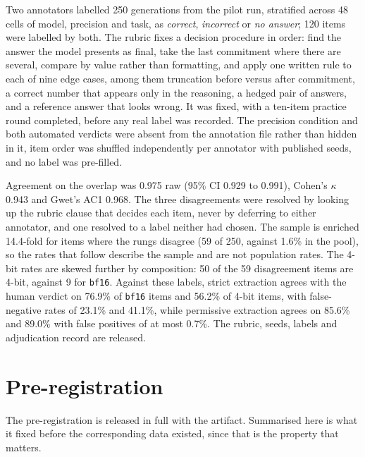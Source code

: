\documentclass[11pt]{article}
\begin{document}
Two annotators labelled 250 generations from the pilot run, stratified across 48 cells of
model, precision and task, as \emph{correct}, \emph{incorrect} or \emph{no answer}; 120
items were labelled by both. The rubric fixes a decision procedure in order: find the answer
the model presents as final, take the last commitment where there are several, compare by
value rather than formatting, and apply one written rule to each of nine edge cases, among
them truncation before versus after commitment, a correct number that appears only in the
reasoning, a hedged pair of answers, and a reference answer that looks wrong. It was fixed,
with a ten-item practice round completed, before any real label was recorded. The precision
condition and both automated verdicts were absent from the annotation file rather than
hidden in it, item order was shuffled independently per annotator with published seeds, and
no label was pre-filled.

Agreement on the overlap was 0.975 raw (95\% CI 0.929 to 0.991), Cohen's $\kappa$ 0.943
and Gwet's AC1 0.968. The three disagreements were resolved by looking up the rubric clause
that decides each item, never by deferring to either annotator, and one resolved to a label
neither had chosen. The sample is enriched 14.4-fold for items where the rungs disagree (59 of 250, against
1.6\% in the pool), so the rates that follow describe the sample and are not population
rates. The 4-bit rates are skewed further by composition: 50 of the 59 disagreement items
are 4-bit, against 9 for \texttt{bf16}. Against these labels, strict extraction agrees with the human verdict on
76.9\% of \texttt{bf16} items and 56.2\% of 4-bit items, with false-negative rates of
23.1\% and 41.1\%, while permissive extraction agrees on 85.6\% and 89.0\% with false
positives of at most 0.7\%. The rubric, seeds, labels and adjudication record are released.

\section{Pre-registration}
\label{app:prereg}


The pre-registration is released in full with the artifact. Summarised here is what it
fixed before the corresponding data existed, since that is the property that matters.
\end{document}
